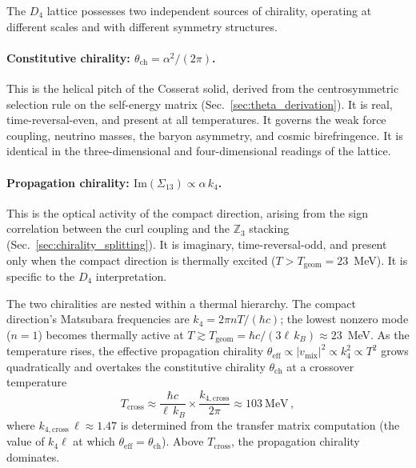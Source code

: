 The $D_4$ lattice possesses two independent sources of chirality, operating at different scales and with different symmetry structures.

\paragraph{Constitutive chirality: $\theta_{\text{ch}} = \alpha^2/(2\pi)$.}  This is the helical pitch of the Cosserat solid, derived from the centrosymmetric selection rule on the self-energy matrix (Sec.~\ref{sec:theta_derivation}).  It is real, time-reversal-even, and present at all temperatures.  It governs the weak force coupling, neutrino masses, the baryon asymmetry, and cosmic birefringence.  It is identical in the three-dimensional and four-dimensional readings of the lattice.

\paragraph{Propagation chirality: $\text{Im}(\Sigma_{13}) \propto \alpha\,k_4$.}  This is the optical activity of the compact direction, arising from the sign correlation between the curl coupling and the $\mathbb{Z}_3$ stacking (Sec.~\ref{sec:chirality_splitting}).  It is imaginary, time-reversal-odd, and present only when the compact direction is thermally excited ($T > T_{\text{geom}} = 23$~MeV).  It is specific to the $D_4$ interpretation.

The two chiralities are nested within a thermal hierarchy.  The compact direction's Matsubara frequencies are $k_4 = 2\pi n T/(\hbar c)$; the lowest nonzero mode ($n = 1$) becomes thermally active at $T \gtrsim T_{\text{geom}} = \hbar c/(3\ell\,k_B) \approx 23$~MeV.  As the temperature rises, the effective propagation chirality $\theta_{\text{eff}} \propto |v_{\text{mix}}|^2 \propto k_4^2 \propto T^2$ grows quadratically and overtakes the constitutive chirality $\theta_{\text{ch}}$ at a crossover temperature
\begin{equation}
T_{\text{cross}} \approx \frac{\hbar c}{\ell\,k_B} \times \frac{k_{4,\text{cross}}}{2\pi} \approx 103~\text{MeV}\,,
\label{eq:T_cross}
\end{equation}
where $k_{4,\text{cross}}\,\ell \approx 1.47$ is determined from the transfer matrix computation (the value of $k_4\ell$ at which $\theta_{\text{eff}} = \theta_{\text{ch}}$).  Above $T_{\text{cross}}$, the propagation chirality dominates.

